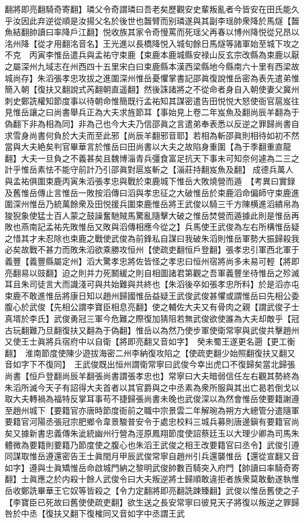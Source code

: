 翻將即亮翻騎奇寄翻】璘父令奇謂璘曰吾老矣歷觀安史輩叛亂者今皆安在田氏能久乎汝因此弃逆從順是汝揚父名於後世也齧臂而别璘遂與其副李瑶帥衆降於馬燧【齧魚結翻帥讀曰率降戶江翻】悦收族其家令奇慢罵而死瑶父再春以博州降悦從兄昂以洺州降【從才用翻洺音名】王光進以長橋降悦入城旬餘日馬燧等諸軍始至城下攻之不克　丙寅李惟岳遣兵與孟祐守束鹿【束鹿本鹿城縣安禄山反玄宗改縣為束鹿以厭之屬深州九域志在州西四十五里宋白曰束鹿縣本漢西梁縣地今縣南六十里有西梁故城尚存】朱滔張孝忠攻拔之進圍深州惟岳憂懼掌書記邵眞復說惟岳密為表先遣弟惟簡入朝【復扶又翻說式芮翻朝直遥翻】然後誅諸將之不從命者身自入朝使妻父冀州刺史鄭詵權知節度事以待朝命惟簡既行孟祐知其謀密遣告田悦悦大怒使衙官扈岌往見惟岳讓之曰尚書舉兵正為大夫求旌節耳【事始見上卷二年岌魚及翻尚辰羊翻為于偽翻下非為相為同】非為己也今大夫乃信邵眞之言遣弟奉表悉以反逆之罪歸尚書自求雪身尚書何負於大夫而至此邪【尚辰羊翻邪音耶】若相為斬邵眞則相待如初不然當與大夫絶矣判官畢華言於惟岳曰田尚書以大夫之故陷身重圍【為于季翻重直龍翻】大夫一旦負之不義甚矣且魏博淄青兵彊食富足抗天下事未可知奈何遽為二三之計乎惟岳素怯不能守前計乃引邵眞對扈岌斬之【淄莊持翻岌魚及翻】成德兵萬人與孟祐俱圍束鹿丙寅朱滔張孝忠與戰於束鹿城下惟岳大敗燒營而遁　【考異曰實録及舊惟岳傳止言惟岳一敗按滔傳曰滔與孝忠征之大破惟岳於束鹿滔命偏師守束鹿進圍深州惟岳乃統萬餘衆及田悦援兵圍束鹿惟岳將王武俊以騎三千方陳横進滔繢帛為狻猊象使猛士百人蒙之鼓譟奮馳賊馬驚亂隨擊大破之惟岳焚營而遁據此則是惟岳再敗也燕南記孟祐先敗惟岳又敗與滔傳相應今從之】兵馬使王武俊為左右所構惟岳疑之惜其才未忍除也束鹿之戰使武俊為前鋒私自謀曰我破朱滔則惟岳軍勢大振歸殺我必矣故戰不甚力而敗朱滔欲乘勝攻恒州【使疏吏翻恒戶登翻】張孝忠引軍西北軍于義豐【義豐縣屬定州】滔大驚孝忠將佐皆怪之孝忠曰恒州宿將尚多未易可輕【將即亮翻易以豉翻】迫之則并力死鬭緩之則自相圖諸君第觀之吾軍義豐坐待惟岳之殄滅耳且朱司徒言大而識淺可與共始難與共終也【朱滔後卒如張孝忠所料】於是滔亦屯束鹿不敢進惟岳將康日知以趙州歸國惟岳益疑王武俊武俊甚懼或謂惟岳曰先相公委腹心於武俊【先相公謂李寶臣相息亮翻】使之輔佐大夫又有骨肉之親【謂武俊子士真壻於李氏】武俊勇冠三軍今危難之際復加猜阻若無武俊欲使誰為大夫却敵乎【冠古玩翻難乃旦翻復扶又翻為于偽翻】惟岳以為然乃使步軍使衛常寧與武俊共擊趙州又使王士眞將兵宿府中以自衛【將即亮翻又音如字】　癸未蜀王遂更名遡【更工衡翻】　淮南節度使陳少遊拔海密二州李納復攻陷之【使疏吏翻少始照翻復扶又翻又音如字下不復同】　王武俊既出恒州謂衛常寧曰武俊今幸出虎口不復歸矣當北歸張尚書【恒戶登翻尚辰羊翻張尚書謂張孝忠也】常寧曰大夫暗弱信任左右觀其勢終為朱滔所滅今天子有詔得大夫首者以其官爵與之中丞素為衆所服與其出亡曷若倒戈以取大夫轉禍為福特反掌耳事苟不捷歸張尚書未晚也武俊深以為然會惟岳使要籍謝遵至趙州城下【要籍官亦唐時節度衙前之職中宗景雲二年解琬為朔方大總管分遣隨軍要籍官河陽丞張冠宗肥鄉令韋景駿普安令于處忠校料三城兵募則唐邊鎭有要籍官尚矣又據新書忠義傳朱泚統幽州行營為涇原鳳翔節度使詔蔡廷玉以大理少卿為司馬朱體微為要籍則要籍乃節度使之腹心也朱滔王武俊之相王改要籍官曰丞令】武俊引遵同謀取惟岳遵還密告王士眞閏月甲辰武俊常寧自趙州引兵還襲惟岳【還從宣翻又音如字】遵與士眞矯惟岳命啟城門納之黎明武俊帥數百騎突入府門【帥讀曰率騎奇寄翻】士眞應之於内殺十餘人武俊令曰大夫叛逆將士歸順敢違拒者族衆莫敢動遂執惟岳收鄭詵畢華王它奴等皆殺之【令力定翻將即亮翻詵踈臻翻】武俊以惟岳舊使之子【李寶臣已死故曰舊使使疏吏翻】欲生送之長安常寧曰彼見天子將復以叛逆之罪歸咎於中丞【復扶又翻下復榷同又音如字中丞謂王武